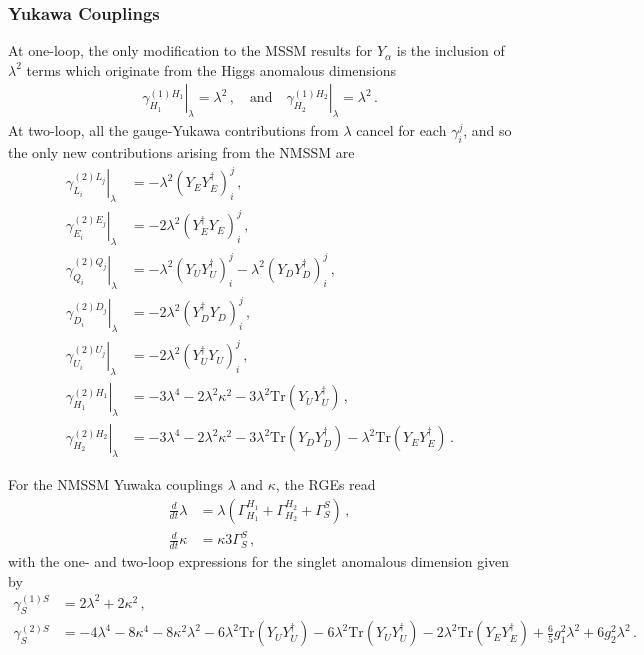 \documentclass[final,3p,times,pdflatex]{elsarticle}
\newcommand{\lamsq}{\lambda^2}
\newcommand{\kapsq}{\kappa^2}
\newcommand{\tr}{\mathrm{Tr}}
\newcommand{\dt}{\frac{d}{dt}}
\begin{document}
\subsubsection{Yukawa Couplings}
At one-loop, the only modification to the MSSM results \cite{MV94,Yam94} for 
$Y_\alpha$ is the inclusion of $\lamsq$ terms which originate from the Higgs 
anomalous dimensions
%
\begin{align}
\left.\gamma^{(1) H_1}_{H_1}\right|_\lambda = \lamsq\,, 
\quad \mbox{and} \quad \left.\gamma^{(1) H_2}_{H_2} \right|_\lambda = \lamsq\,.
\end{align}
%
At two-loop, all the gauge-Yukawa contributions from $\lambda$ cancel for each 
$\gamma_i^j$, and so the only new contributions arising from the NMSSM are
%
\begin{align}
\left.\gamma_{L_i}^{(2)L_j}\right|_\lambda &= -\lamsq (Y_E Y_E^\dagger)_i^j\,, \\
%
\left.\gamma_{E_i}^{(2)E_j}\right|_\lambda &= -2\lamsq (Y_E^\dagger Y_E)_i^j\,, \\
%
\left.\gamma_{Q_i}^{(2)Q_j}\right|_\lambda &= -\lamsq (Y_U Y_U^\dagger)_i^j 
- \lamsq (Y_D Y_D^\dagger)_i^j\,, \\
%
\left.\gamma_{D_i}^{(2)D_j}\right|_\lambda &= -2\lamsq (Y_D^\dagger Y_D)_i^j\,, \\
%
\left.\gamma_{U_i}^{(2)U_j}\right|_\lambda &= -2\lamsq (Y_U^\dagger Y_U)_i^j \,, \\
%
\left.\gamma_{H_1}^{(2)H_1}\right|_\lambda &= -3\lambda^4 -2\lamsq\kapsq 
- 3\lamsq \tr(Y_U Y_U^\dagger)\,, \\
%
\left.\gamma_{H_2}^{(2)H_2}\right|_\lambda &= -3\lambda^4 -2\lamsq\kapsq 
- 3\lamsq \tr(Y_D Y_D^\dagger) - \lamsq \tr(Y_E Y_E^\dagger)\,.
\end{align}
%

For the NMSSM Yuwaka couplings $\lambda$ and $\kappa$, the RGEs read
%
\begin{align}
\dt\lambda &= \lambda (\Gamma^{H_1}_{H_1} + \Gamma^{H_2}_{H_2} + \Gamma^S_S)\,, \\
%
\dt\kappa &= \kappa 3\Gamma_S^S\,,
\end{align}
%
with the one- and two-loop expressions for the singlet anomalous dimension 
given by
%
\begin{align}
\gamma_S^{(1)S} &= 2\lamsq + 2\kapsq\,,\\
%
\gamma_S^{(2)S} &= -4\lambda^4 - 8\kappa^4 - 8 \kapsq\lamsq 
- 6\lamsq \tr(Y_UY_U^\dagger) - 6\lamsq \tr(Y_UY_U^\dagger) 
- 2\lamsq \tr(Y_EY_E^\dagger) + \tfrac{6}{5}g_1^2\lamsq + 6g_2^2\lamsq\,.
\end{align} 
\end{document}
